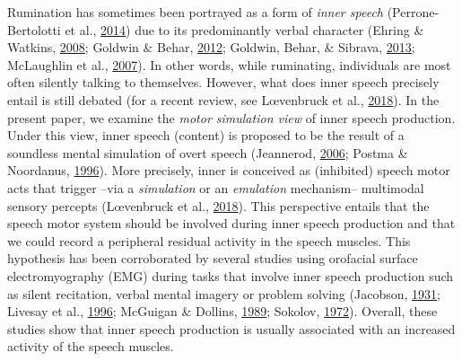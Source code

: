 \documentclass[a4paper,12pt,twoside,openright,oldfontcommands]{memoir}
\begin{document}
Rumination has sometimes been portrayed as a form of \emph{inner speech} (Perrone-Bertolotti et al., \protect\hyperlink{ref-Perrone-Bertolotti2014}{2014}) due to its predominantly verbal character (Ehring \& Watkins, \protect\hyperlink{ref-ehring_repetitive_2008}{2008}; Goldwin \& Behar, \protect\hyperlink{ref-goldwin_concreteness_2012}{2012}; Goldwin, Behar, \& Sibrava, \protect\hyperlink{ref-goldwin_concreteness_2013}{2013}; McLaughlin et al., \protect\hyperlink{ref-mclaughlin_effects_2007}{2007}). In other words, while ruminating, individuals are most often silently talking to themselves. However, what does inner speech precisely entail is still debated (for a recent review, see Lœvenbruck et al., \protect\hyperlink{ref-loevenbruck_cognitive_2018}{2018}). In the present paper, we examine the \emph{motor simulation view} of inner speech production. Under this view, inner speech (content) is proposed to be the result of a soundless mental simulation of overt speech (Jeannerod, \protect\hyperlink{ref-jeannerod_motor_2006}{2006}; Postma \& Noordanus, \protect\hyperlink{ref-postma_production_1996}{1996}). More precisely, inner is conceived as (inhibited) speech motor acts that trigger --via a \emph{simulation} or an \emph{emulation} mechanism-- multimodal sensory percepts (Lœvenbruck et al., \protect\hyperlink{ref-loevenbruck_cognitive_2018}{2018}). This perspective entails that the speech motor system should be involved during inner speech production and that we could record a peripheral residual activity in the speech muscles. This hypothesis has been corroborated by several studies using orofacial surface electromyography (EMG) during tasks that involve inner speech production such as silent recitation, verbal mental imagery or problem solving (Jacobson, \protect\hyperlink{ref-jacobson_electrical_1931}{1931}; Livesay et al., \protect\hyperlink{ref-livesay_covert_1996}{1996}; McGuigan \& Dollins, \protect\hyperlink{ref-mcguigan_patterns_1989}{1989}; Sokolov, \protect\hyperlink{ref-sokolov_inner_1972}{1972}). Overall, these studies show that inner speech production is usually associated with an increased activity of the speech muscles.
\end{document}
